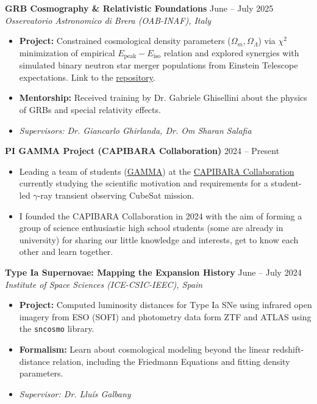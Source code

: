\documentclass[11pt,a4paper]{article}
\begin{document}
\textbf{GRB Cosmography \& Relativistic Foundations} \hfill June -- July 2025\\
\textit{Osservatorio Astronomico di Brera (OAB-INAF), Italy}
\begin{itemize}
	\item \textbf{Project:} Constrained cosmological density parameters ($\Omega_m, \Omega_\Lambda$) via $\chi^2$ minimization of empirical $E_\text{peak}-E_\text{iso}$ relation and explored synergies with simulated binary neutron star merger populations from Einstein Telescope expectations. Link to the \href{https://github.com/joanalnu/oab-inaf}{repository}.
	\item \textbf{Mentorship:} Received training by Dr. Gabriele Ghisellini about the physics of GRBs and special relativity effects.
	\item \textit{Supervisors: Dr. Giancarlo Ghirlanda, Dr. Om Sharan Salafia}
\end{itemize}

\textbf{PI GAMMA Project (CAPIBARA Collaboration)} \hfill 2024 -- Present
\begin{itemize}
	\item Leading a team of students (\href{https://capibara3.github.io/gamma/}{GAMMA}) at the \href{https://capibara3.github.io}{CAPIBARA Collaboration} currently studying the scientific motivation and requirements for a student-led $\gamma$-ray transient observing CubeSat mission.
	\item I founded the CAPIBARA Collaboration in 2024 with the aim of forming a group of science enthusiastic high school students (some are already in university) for sharing our little knowledge and interests, get to know each other and learn together.
\end{itemize}

\textbf{Type Ia Supernovae: Mapping the Expansion History} \hfill June -- July 2024 \\
\textit{Institute of Space Sciences (ICE-CSIC-IEEC), Spain}
\begin{itemize}
	\item \textbf{Project:} Computed luminosity distances for Type Ia SNe using infrared open imagery from ESO (SOFI) and photometry data form ZTF and ATLAS using the \verb|sncosmo| library.
	\item \textbf{Formalism:} Learn about cosmological modeling beyond the linear redshift-distance relation, including the Friedmann Equations and fitting density parameters.
	\item \textit{Supervisor: Dr. Lluís Galbany}
\end{itemize}
\end{document}
